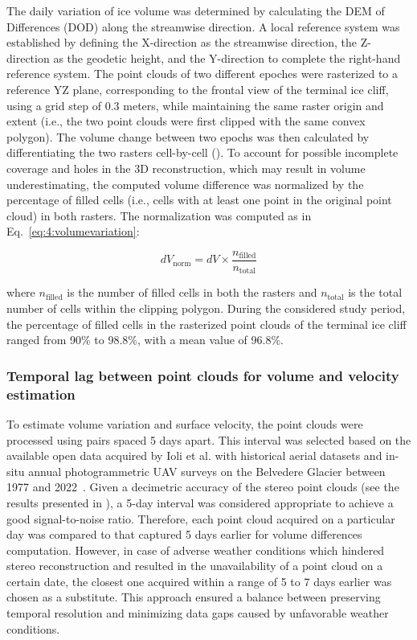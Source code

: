 The daily variation of ice volume was determined by calculating the DEM of Differences
(DOD) along the streamwise direction. A local reference system was established by
defining the X-direction as the streamwise direction, the Z-direction as the geodetic
height, and the Y-direction to complete the right-hand reference system.
The point clouds of two different epoches were rasterized to a reference YZ plane,
corresponding to the frontal view of the terminal ice cliff, using a grid step of 0.3
meters, while maintaining the same raster origin and extent (i.e., the two point clouds
were first clipped with the same convex polygon).
The volume change between two epochs was then calculated by differentiating the
two rasters cell-by-cell ().
To account for possible incomplete coverage and holes in the 3D reconstruction, which may
result in volume underestimating, the computed volume difference was normalized by the
percentage of filled cells (i.e., cells with at least one point in the original point
cloud) in both rasters.
The normalization was computed as in Eq.~\ref{eq:4:volumevariation}:

\begin{equation}
  dV_{\text{norm}} = dV \times
  \frac{n_{\text{filled}}}{n_{\text{total}}}
  \label{eq:4:volumevariation}
\end{equation}

where \( n_{\text{filled}} \) is the number of filled cells in both the rasters and \(
n_{\text{total}} \) is the total number of cells within the clipping polygon.
During the considered study period, the percentage of filled cells in the rasterized
point clouds of the terminal ice cliff ranged from 90\% to
98.8\%, with a mean value of 96.8\%.


\subsubsection{Temporal lag between point clouds for volume and velocity estimation}
\label{sec:4:timelag}

To estimate volume variation and surface velocity, the point clouds were processed using
pairs spaced 5 days apart.
This interval was selected based on the available open data acquired by Ioli et al. with
historical aerial datasets and in-situ annual photogrammetric UAV surveys on the
Belvedere Glacier between 1977 and 2022~\citep{Ioli2022,ioli_2023_zenodo,Degaetani2021}.
Given a decimetric accuracy of the stereo point clouds (see the results presented
in ), a 5-day interval was considered appropriate to
achieve a good signal-to-noise ratio.
Therefore, each point cloud acquired on a particular day was compared to that captured
5 days earlier for volume differences computation.
However, in case of adverse weather conditions which hindered stereo reconstruction and
resulted in the unavailability of a point cloud on a certain date, the closest one
acquired within a range of 5 to 7 days earlier was chosen as a substitute.
This approach ensured a balance between preserving temporal resolution and minimizing
data gaps caused by unfavorable weather conditions.

